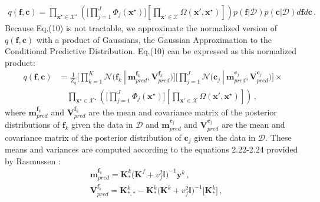 \begin{align}
q(\boldsymbol{f},\boldsymbol{c}) = \prod_{\textbf{x}^\star\in \mathcal{X}^\star} 
        \left(
        \Bigg[\prod_{j=1}^{J}\Phi_j(\textbf{x}^{\star})\Bigg]
        \left[ 
        \prod_{\textbf{x}'\in \mathcal{X}} 
        \Omega(\textbf{x}',\textbf{x}^{\star})
        \right] 
        \right)
p(\textbf{f}|\mathcal{D}) p(\textbf{c}|\mathcal{D})
 d\textbf{f} d\textbf{c}\,.
\end{align}
Because Eq.(10) is not tractable, we approximate the normalized version of $q(\boldsymbol{f},\boldsymbol{c})$ with a product of Gaussians, the Gaussian Approximation to the Conditional Predictive Distribution. Eq.(10) can be expressed as this normalized product:
\begin{align}
q(\boldsymbol{f},\boldsymbol{c}) & = \frac{1}{Z_q} \bigg[\prod_{k=1}^{K}\mathcal{N}\big(\boldsymbol{f}_k\ |\  \boldsymbol{m}_{pred}^{\boldsymbol{f}_k}, \boldsymbol{V}_{pred}^{\boldsymbol{f}_k}\big)\bigg] \bigg[\prod_{j=1}^{J}\mathcal{N}\big(\boldsymbol{c}_j\ |\  \boldsymbol{m}_{pred}^{\boldsymbol{c}_j}, \boldsymbol{V}_{pred}^{\boldsymbol{c}_j}\big)\bigg] \times \nonumber
\\
        & \quad \prod_{\textbf{x}^\star\in \mathcal{X}^\star} 
        \left(
        \Bigg[\prod_{j=1}^{J}\Phi_j(\textbf{x}^{\star})\Bigg]
        \left[ 
        \prod_{\textbf{x}'\in \mathcal{X}} 
        \Omega(\textbf{x}',\textbf{x}^{\star})
        \right] 
        \right)\,,
\end{align}
where $\boldsymbol{m}_{pred}^{\boldsymbol{f}_k}$ and $\boldsymbol{V}_{pred}^{\boldsymbol{f}_k}$ are the mean and covariance matrix of the posterior distributions of $\boldsymbol{f}_k$ given the data in $\mathcal{D}$ and $\boldsymbol{m}_{pred}^{\boldsymbol{c}_j}$ and $\boldsymbol{V}_{pred}^{\boldsymbol{c}_j}$ are the mean and covariance matrix of the posterior distribution of $\boldsymbol{c}_j$ given the data in $\mathcal{D}$. These means and variances are computed according to the equations 2.22-2.24 provided by Rasmussen \citep{rasmussen2003gaussian}:
\begin{align}
    &
    \boldsymbol{m}_{pred}^{\boldsymbol{f}_{k}} = \boldsymbol{K}_{*}^{k}\big(\boldsymbol{K}^{f} + v_{f}^{2}        \mathds{I}\big)^{-1}\boldsymbol{y}^k\,, \nonumber \\
    & 
    \boldsymbol{V}_{pred}^{\boldsymbol{f}_{k}} = \boldsymbol{K}_{*,*}^{k} - \boldsymbol{K}_{*}^{k}\big(\boldsymbol{K}^{k} + v_{f}^{2}        \mathds{I}\big)^{-1}\big[\boldsymbol{K}_{*}^{k}\big]\,,
\end{align}
